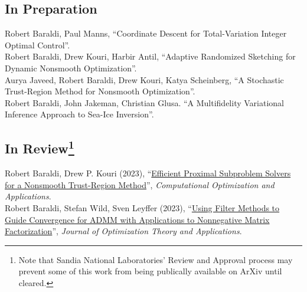 \documentclass[10pt, a4paper]{article}
\newcommand{\years}[1]{\marginnote{\scriptsize #1}}
\begin{document}
\subsection*{In Preparation}
\years{2023-} Robert Baraldi, Paul Manns, ``Coordinate Descent for Total-Variation Integer Optimal Control''. \\
\years{2023-} Robert Baraldi, Drew Kouri, Harbir Antil, ``Adaptive Randomized Sketching for Dynamic Nonsmooth Optimization''. \\
\years{2023-} Aurya Javeed, Robert Baraldi, Drew Kouri, Katya Scheinberg, ``A Stochastic Trust-Region Method for Nonsmooth Optimization''.\\
\years{2023-} Robert Baraldi, John Jakeman, Christian Glusa. ``A Multifidelity Variational Inference Approach to Sea-Ice Inversion''.

\subsection*{In Review\footnote{\tiny Note that Sandia National Laboratories' Review and Approval process may prevent some of this work from being publically available on ArXiv until cleared. }}
\years{2023} Robert Baraldi, Drew P. Kouri (2023), ``\href{https://optimization-online.org/2023/11/efficient-proximal-subproblem-solvers-for-a-nonsmooth-trust-region-method/}{Efficient Proximal Subproblem Solvers for a Nonsmooth Trust-Region Method}'', \emph{Computational Optimization and Applications}. \\
\years{2023} Robert Baraldi, Stefan Wild, Sven Leyffer (2023), ``\href{https://optimization-online.org/2024/02/using-filter-methods-to-guide-convergence-for-admm-with-applications-to-nonnegative-matrix-factorization-problems/}{Using Filter Methods to Guide Convergence for ADMM with Applications to Nonnegative Matrix Factorization}'', \emph{Journal of Optimization Theory and Applications}.\\
\end{document}
